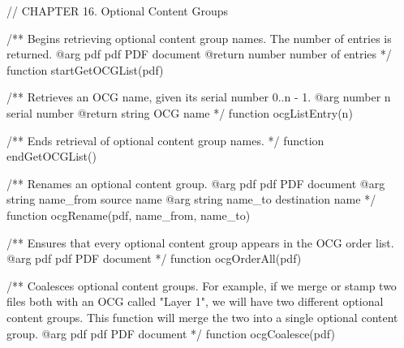 // CHAPTER 16. Optional Content Groups

/** Begins retrieving optional content group names. The number of entries is returned.
@arg {pdf} pdf PDF document
@return {number} number of entries */
function startGetOCGList(pdf) {}

/** Retrieves an OCG name, given its serial number 0..n - 1.
@arg {number} n serial number
@return {string} OCG name */
function ocgListEntry(n) {}

/** Ends retrieval of optional content group names. */
function endGetOCGList() {}

/** Renames an optional content group.
@arg {pdf} pdf PDF document
@arg {string} name_from source name
@arg {string} name_to destination name */
function ocgRename(pdf, name_from, name_to) {}

/** Ensures that every optional content group appears in the OCG order list.
@arg {pdf} pdf PDF document */
function ocgOrderAll(pdf) {}

/** Coalesces optional content groups. For example, if we merge or stamp two
files both with an OCG called "Layer 1", we will have two different optional
content groups. This function will merge the two into a single optional
content group.
@arg {pdf} pdf PDF document */
function ocgCoalesce(pdf) {}


